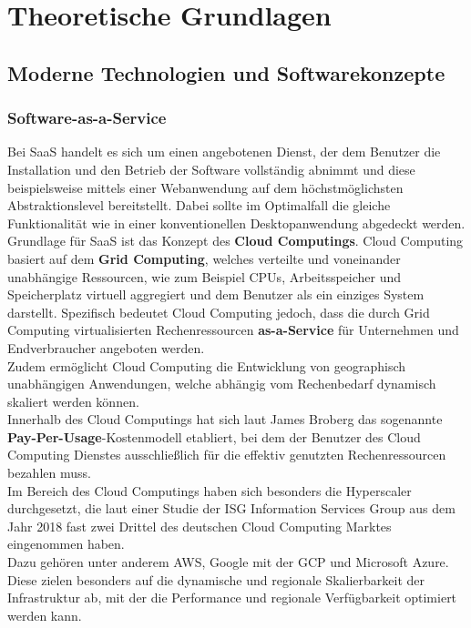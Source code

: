 \chapter{Theoretische Grundlagen}
\section{Moderne Technologien und Softwarekonzepte}
\subsection{Software-as-a-Service}
\label{theorie_saas}
Bei \acl{SaaS} handelt es sich um einen angebotenen Dienst, der dem Benutzer die Installation und den Betrieb der Software vollständig abnimmt und diese beispielsweise mittels einer Webanwendung auf dem höchstmöglichsten Abstraktionslevel bereitstellt. Dabei sollte im Optimalfall die gleiche Funktionalität wie in einer konventionellen Desktopanwendung abgedeckt werden. 
\autocite[Vgl.][S. 13, 15]{Buyya.2011} \\
Grundlage für \ac{SaaS} ist das Konzept des \textbf{Cloud Computings}. Cloud Computing basiert auf dem \textbf{Grid Computing}, welches verteilte und voneinander unabhängige Ressourcen, wie zum Beispiel \acsp{CPU}, Arbeitsspeicher und Speicherplatz virtuell aggregiert und dem Benutzer als ein einziges System darstellt. Spezifisch bedeutet Cloud Computing jedoch, dass die durch Grid Computing virtualisierten Rechenressourcen \textbf{as-a-Service} für Unternehmen und Endverbraucher angeboten werden.\\
Zudem ermöglicht Cloud Computing die Entwicklung von geographisch unabhängigen Anwendungen, welche abhängig vom Rechenbedarf dynamisch skaliert werden können.\autocite[Vgl.][S. 3]{Buyya.2011}\\
Innerhalb des Cloud Computings hat sich laut James Broberg das sogenannte \textbf{Pay-Per-Usage}-Kostenmodell etabliert, bei dem der Benutzer des Cloud Computing Dienstes ausschließlich für die effektiv genutzten Rechenressourcen bezahlen muss.\autocite[Vgl.][S. 9-10]{Buyya.2011}\\
Im Bereich des Cloud Computings haben sich besonders die Hyperscaler durchgesetzt, die laut einer Studie der ISG Information Services Group aus dem Jahr 2018 fast zwei Drittel des deutschen Cloud Computing Marktes eingenommen haben.\autocite[Vgl.][S. 1]{Henkes.2018}\\
Dazu gehören unter anderem \ac{AWS}, Google mit der \ac{GCP} und Microsoft Azure. Diese zielen besonders auf die dynamische und regionale Skalierbarkeit der Infrastruktur ab, mit der die Performance und regionale Verfügbarkeit optimiert werden kann.\\
